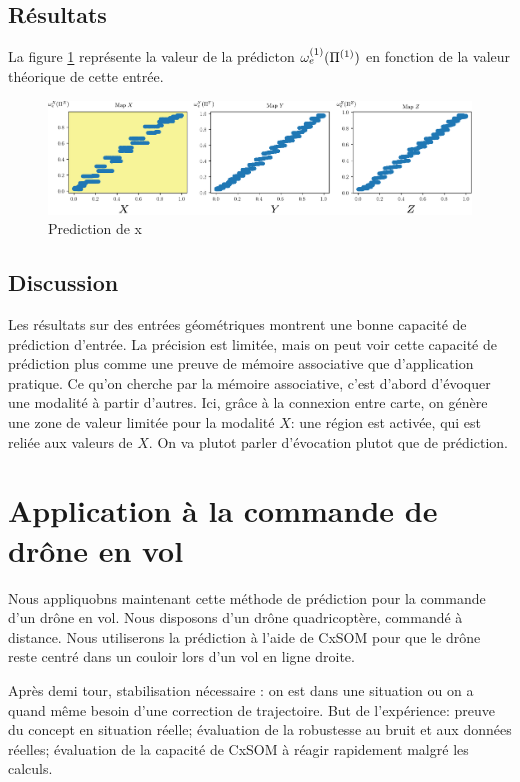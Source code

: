 \subsection{Résultats}

La figure \ref{fig:pred} représente la valeur de la prédicton $\omega_{e}^{({1})}(\Pi^{({1})})$ en fonction de la valeur théorique de cette entrée. 
\begin{figure}
\centering
\includegraphics[width=\textwidth]{prediction_x2}
\caption{Prediction de x}
\label{fig:pred}
\end{figure}


\subsection{Discussion}
Les résultats sur des entrées géométriques montrent une bonne capacité de prédiction d'entrée.
La précision est limitée, mais on peut voir cette capacité de prédiction plus comme une preuve de mémoire associative que d'application pratique.
Ce qu'on cherche par la mémoire associative, c'est d'abord d'évoquer une modalité à partir d'autres. Ici, grâce à la connexion entre carte, on génère une zone de valeur limitée pour la modalité $X$: une région est activée, qui est reliée aux valeurs de $X$.
On va plutot parler d'évocation plutot que de prédiction. 

\section{Application à la commande de drône en vol}

Nous appliquobns maintenant cette méthode de prédiction pour la commande d'un drône en vol. Nous disposons d'un drône quadricoptère, commandé à distance. Nous utiliserons la prédiction à l'aide de CxSOM pour que le drône reste centré dans un couloir lors d'un vol en ligne droite. 

Après demi tour, stabilisation nécessaire : on est dans une situation ou on a quand même besoin d'une correction de trajectoire.
But de l'expérience: preuve du concept en situation réelle; évaluation de la robustesse au bruit et aux données réelles; évaluation de la capacité de CxSOM à réagir rapidement malgré les calculs.

